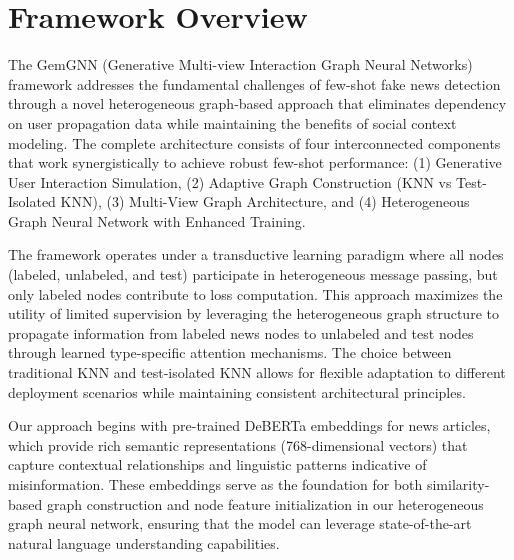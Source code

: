 
\section{Framework Overview}

The GemGNN (Generative Multi-view Interaction Graph Neural Networks) framework addresses the fundamental challenges of few-shot fake news detection through a novel heterogeneous graph-based approach that eliminates dependency on user propagation data while maintaining the benefits of social context modeling. The complete architecture consists of four interconnected components that work synergistically to achieve robust few-shot performance: (1) Generative User Interaction Simulation, (2) Adaptive Graph Construction (KNN vs Test-Isolated KNN), (3) Multi-View Graph Architecture, and (4) Heterogeneous Graph Neural Network with Enhanced Training.


The framework operates under a transductive learning paradigm where all nodes (labeled, unlabeled, and test) participate in heterogeneous message passing, but only labeled nodes contribute to loss computation. This approach maximizes the utility of limited supervision by leveraging the heterogeneous graph structure to propagate information from labeled news nodes to unlabeled and test nodes through learned type-specific attention mechanisms. The choice between traditional KNN and test-isolated KNN allows for flexible adaptation to different deployment scenarios while maintaining consistent architectural principles.


Our approach begins with pre-trained DeBERTa embeddings for news articles, which provide rich semantic representations (768-dimensional vectors) that capture contextual relationships and linguistic patterns indicative of misinformation. These embeddings serve as the foundation for both similarity-based graph construction and node feature initialization in our heterogeneous graph neural network, ensuring that the model can leverage state-of-the-art natural language understanding capabilities.

